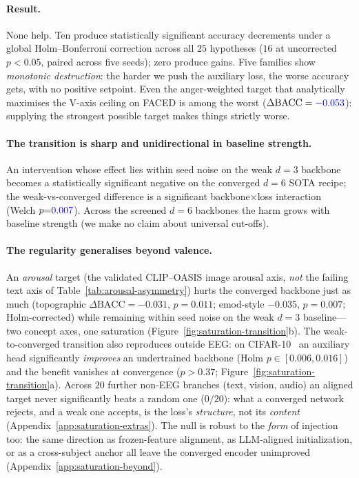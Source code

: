 \paragraph{Result.} None help. Ten produce statistically
significant accuracy decrements under a global Holm--Bonferroni correction
across all $25$ hypotheses ($16$ at uncorrected $p<0.05$, paired across five seeds);
zero produce gains. Five families show \emph{monotonic destruction}:
the harder we push the auxiliary loss, the worse accuracy gets, with
no positive setpoint. Even the anger-weighted target that
analytically maximises the V-axis ceiling on FACED is among the worst
($\Delta\mathrm{BACC} = {\color{blue}-0.053}$): supplying the strongest possible
target makes things strictly worse.

\paragraph{The transition is sharp and unidirectional in baseline
strength.} An intervention whose effect lies within seed noise on the
weak $d{=}3$ backbone becomes a statistically significant
negative on the converged $d{=}6$ SOTA recipe; the
weak-vs-converged difference is a significant backbone$\times$loss
interaction (Welch $p{=}{\color{blue}0.007}$). Across the screened $d{=}6$ backbones the
harm grows with baseline strength (we make no claim about universal cut-offs).

\paragraph{The regularity generalises beyond valence.}
An \emph{arousal} target (the validated CLIP--OASIS image arousal axis,
\emph{not} the failing text axis of Table~\ref{tab:arousal-asymmetry})
hurts the converged backbone just as much (topographic
$\Delta\mathrm{BACC}={-}0.031$, $p{=}0.011$; emod-style ${-}0.035$,
$p{=}0.007$; Holm-corrected) while remaining within seed noise on the
weak $d{=}3$ baseline---two concept axes, one saturation
(Figure~\ref{fig:saturation-transition}b). The weak-to-converged
transition also reproduces outside EEG: on CIFAR-10~\citep{krizhevsky2009cifar} an auxiliary head
significantly \emph{improves} an undertrained backbone (Holm
$p\in[0.006,0.016]$) and the benefit vanishes at convergence
($p{>}0.37$; Figure~\ref{fig:saturation-transition}a).
Across $20$ further non-EEG branches (text, vision, audio) an aligned
target never significantly beats a random one ($0/20$): what a
converged network rejects, and a weak one accepts, is the loss's
\emph{structure}, not its \emph{content}
(Appendix~\ref{app:saturation-extras}). The null is robust to the
\emph{form} of injection too: the same direction as frozen-feature
alignment, as LLM-aligned initialization, or as a cross-subject anchor
all leave the converged encoder unimproved
(Appendix~\ref{app:saturation-beyond}). 


